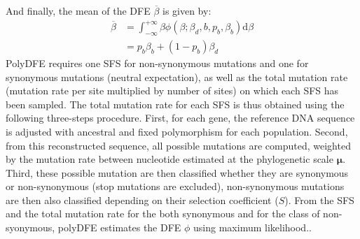 \documentclass{article}
\newcommand{\UniDimArray}[1]{\bm{#1}}
\newcommand{\der}{\mathrm{d}}
\newcommand{\Spop}{\beta}
\newcommand{\SpopMean}{\overline{\Spop}}
\newcommand{\Sphy}{S}
\begin{document}
    And finally, the mean of the DFE $\overline{\Spop}$ is given by:
    \begin{align*}
        \SpopMean & = \int_{-\infty}^{+\infty} \Spop \phi \left( \Spop; \Spop_d , b, p_b, \Spop_b \right) \der \Spop \\
        & =  p_b \Spop_b + \left( 1 - p_b \right) \Spop_d
    \end{align*}
    PolyDFE requires one SFS for non-synonymous mutations and one for synonymous mutations (neutral expectation), as well as the total mutation rate (mutation rate per site multiplied by number of sites) on which each SFS has been sampled.
    The total mutation rate for each SFS is thus obtained using the following three-steps procedure.
    First, for each gene, the reference DNA sequence is adjusted with ancestral and fixed polymorphism for each population.
    Second, from this reconstructed sequence, all possible mutations are computed, weighted by the mutation rate between nucleotide estimated at the phylogenetic scale $\UniDimArray{\mu}$.
    Third, these possible mutation are then classified whether they are synonymous or non-synonymous (stop mutations are excluded), non-synonymous mutations are then also classified depending on their selection coefficient ($\Sphy$).
    From the SFS and the total mutation rate for the both synonymous and for the class of non-syonymous, polyDFE estimates the DFE $\phi$ using maximum likelihood.\@.

    \printbibliography
\end{document}
